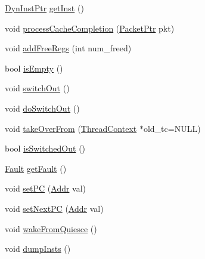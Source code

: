 \begin{DoxyCompactItemize}
\item 
\hyperlink{classFrontEnd_a028ce10889c5f6450239d9e9a7347976}{DynInstPtr} \hyperlink{classFrontEnd_a2032af0310bc2b8b708cac0af3811074}{getInst} ()
\item 
void \hyperlink{classFrontEnd_a3dc029c2e87eb911352b82ff15c86236}{processCacheCompletion} (\hyperlink{classPacket}{PacketPtr} pkt)
\item 
void \hyperlink{classFrontEnd_a5562c5f14a79f595934df368f2e86d54}{addFreeRegs} (int num\_\-freed)
\item 
bool \hyperlink{classFrontEnd_af337ffd75e4f019ce15302c60715d84b}{isEmpty} ()
\item 
void \hyperlink{classFrontEnd_a05f299b443f8cc73a93d61572edc0218}{switchOut} ()
\item 
void \hyperlink{classFrontEnd_a039b639c41c289e1cfe6d71c41d9308c}{doSwitchOut} ()
\item 
void \hyperlink{classFrontEnd_a5a901e7ec5b94a55bd61fde88ad0b7f1}{takeOverFrom} (\hyperlink{classThreadContext}{ThreadContext} $\ast$old\_\-tc=NULL)
\item 
bool \hyperlink{classFrontEnd_a471165257f311a78136ce991a3bad31a}{isSwitchedOut} ()
\item 
\hyperlink{classRefCountingPtr}{Fault} \hyperlink{classFrontEnd_ab9b1142cc382fcfba846b1998e6c2f17}{getFault} ()
\item 
void \hyperlink{classFrontEnd_a9bd96a8460a26f24f520db702f3f6eec}{setPC} (\hyperlink{base_2types_8hh_af1bb03d6a4ee096394a6749f0a169232}{Addr} val)
\item 
void \hyperlink{classFrontEnd_a81b908e5de6420bc0c5a0c5b9b1e38c2}{setNextPC} (\hyperlink{base_2types_8hh_af1bb03d6a4ee096394a6749f0a169232}{Addr} val)
\item 
void \hyperlink{classFrontEnd_a040cbeac7187b0b8cdb1242d3f5aa179}{wakeFromQuiesce} ()
\item 
void \hyperlink{classFrontEnd_a80587b4fe043bbe1995536cb3b361588}{dumpInsts} ()
\end{DoxyCompactItemize}
